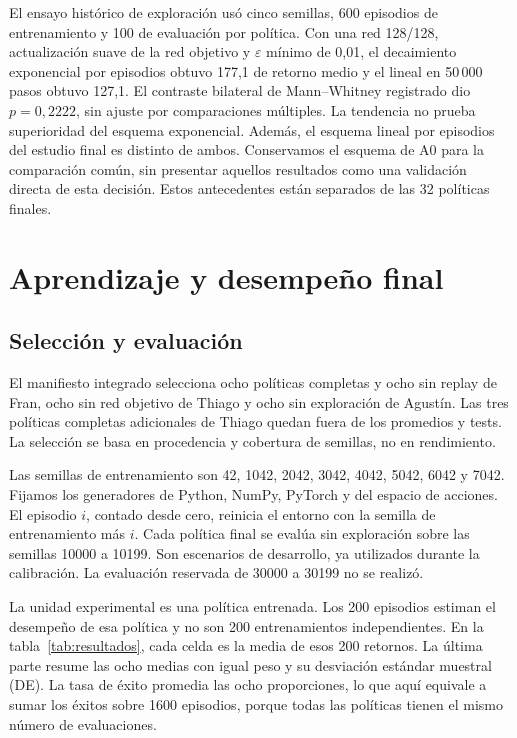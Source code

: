 \documentclass[conference]{IEEEtran}
\begin{document}
El ensayo histórico de exploración usó cinco semillas, 600 episodios de entrenamiento y 100 de evaluación por política. Con una red 128/128, actualización suave de la red objetivo y $\varepsilon$ mínimo de 0,01, el decaimiento exponencial por episodios obtuvo 177,1 de retorno medio y el lineal en 50\,000 pasos obtuvo 127,1. El contraste bilateral de Mann--Whitney registrado dio $p=0{,}2222$, sin ajuste por comparaciones múltiples. La tendencia no prueba superioridad del esquema exponencial. Además, el esquema lineal por episodios del estudio final es distinto de ambos. Conservamos el esquema de A0 para la comparación común, sin presentar aquellos resultados como una validación directa de esta decisión. Estos antecedentes están separados de las 32 políticas finales.

\section{Aprendizaje y desempeño final}
\label{sec:resultados}
\subsection{Selección y evaluación}
El manifiesto integrado selecciona ocho políticas completas y ocho sin replay de Fran, ocho sin red objetivo de Thiago y ocho sin exploración de Agustín. Las tres políticas completas adicionales de Thiago quedan fuera de los promedios y tests. La selección se basa en procedencia y cobertura de semillas, no en rendimiento.

Las semillas de entrenamiento son 42, 1042, 2042, 3042, 4042, 5042, 6042 y 7042. Fijamos los generadores de Python, NumPy, PyTorch y del espacio de acciones. El episodio $i$, contado desde cero, reinicia el entorno con la semilla de entrenamiento más $i$. Cada política final se evalúa sin exploración sobre las semillas 10000 a 10199. Son escenarios de desarrollo, ya utilizados durante la calibración. La evaluación reservada de 30000 a 30199 no se realizó.

La unidad experimental es una política entrenada. Los 200 episodios estiman el desempeño de esa política y no son 200 entrenamientos independientes. En la tabla~\ref{tab:resultados}, cada celda es la media de esos 200 retornos. La última parte resume las ocho medias con igual peso y su desviación estándar muestral (DE). La tasa de éxito promedia las ocho proporciones, lo que aquí equivale a sumar los éxitos sobre 1600 episodios, porque todas las políticas tienen el mismo número de evaluaciones.
\end{document}
